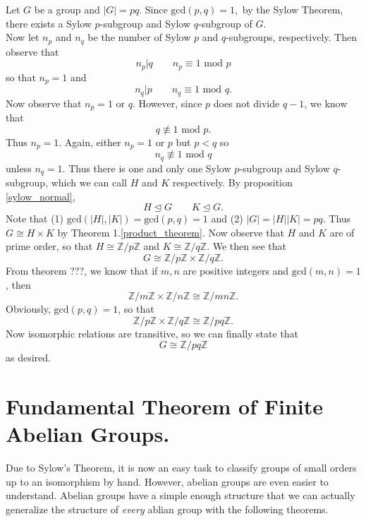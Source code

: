 \documentclass[12pt,letterpaper]{algebra_book}
\theoremstyle{definition}
\begin{document}
    \begin{prf}
        Let $G$ be a group and $|G| = pq$. Since $\mbox{gcd}(p, q) = 1,$
        by the Sylow Theorem, 
        there exists a Sylow $p$-subgroup and Sylow $q$-subgroup of $G$. 
        \\
        Now let $n_p$ and $n_q$ be the number of Sylow $p$ and $q$-subgroups,
        respectively. Then observe that 
        \[
          n_p \big|q \qquad n_p \equiv 1 \mbox{ mod } p   
        \]
        so that $n_p = 1$ and 
        \[
            n_q \big|p   \qquad n_q \equiv 1 \mbox{ mod } q.
        \]
        Now observe that $n_p = 1$ or $q$. However, since $p$ does not divide
        $q - 1$, we know that 
        \[
          q \not\equiv 1 \mbox{ mod } p.  
        \]
        Thus $n_p = 1$. Again, either $n_p = 1$ or $p$ but $p < q$ so 
        \[
           n_q \not\equiv 1 \mbox{ mod } q 
        \]
        unless $n_q = 1$. Thus there is one and only one Sylow $p$-subgroup
        and Sylow $q$-subgroup, which we can call $H$ and $K$ respectively.
        By proposition \ref{sylow_normal}, 
        \[
          H \unlhd G \qquad K \unlhd G.  
        \]
        Note that (1)
        $\mbox{gcd}(|H|, |K|) = \mbox{gcd}(p, q) = 1$ and (2) $|G| = |H||K| =
        pq$. Thus $G \cong H \times K$ by Theorem 1.\ref{product_theorem}. Now observe that $H$ and $K$ are of
        prime order, so that $H \cong \mathbb{Z}/p\mathbb{Z}$ and $K \cong
        \mathbb{Z}/q\mathbb{Z}$. We then see that 
        \[
           G \cong  \mathbb{Z}/p\mathbb{Z} \times \mathbb{Z}/q\mathbb{Z}.
        \]
        From theorem ???, we know that if $m, n$ are positive
        integers and $\mbox{gcd}(m, n) = 1$, then 
        \[
            \mathbb{Z}/m\mathbb{Z} \times \mathbb{Z}/n\mathbb{Z} 
            \cong \mathbb{Z}/mn\mathbb{Z}.
        \]
        Obviously, $\mbox{gcd}(p, q) = 1$, so that 
        \[
            \mathbb{Z}/p\mathbb{Z} \times \mathbb{Z}/q\mathbb{Z}
            \cong \mathbb{Z}/pq\mathbb{Z}.
        \] 
        Now isomorphic relations are transitive, so we can finally state that 
        \[
           G \cong \mathbb{Z}/pq\mathbb{Z}
        \]
        as desired.
    \end{prf}

    \newpage
    \section{Fundamental Theorem of Finite Abelian Groups.}
    
    Due to Sylow's Theorem, it is now an easy task to classify groups
    of small orders up to an isomorphism by hand. However, abelian
    groups are even easier to understand. Abelian groups have a simple
    enough structure that we can actually generalize the structure of
    \textit{every} ablian group with the following theorems.
\end{document}
